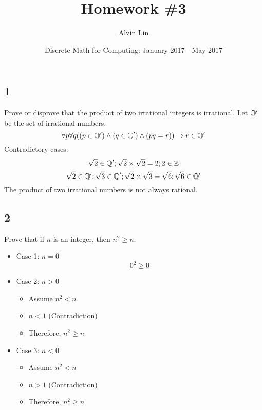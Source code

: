 \documentclass{math}
\title{Homework \#3}
\author{Alvin Lin}
\date{Discrete Math for Computing: January 2017 - May 2017}
\begin{document}
\maketitle

\subsection*{1}
Prove or disprove that the product of two irrational integers is irrational.
Let \( \mathbb{Q'} \) be the set of irrational numbers.
\[ \forall{p}\forall{q}((p\in\mathbb{Q'})\wedge(q\in\mathbb{Q'})\wedge(pq = r))\to r\in\mathbb{Q'} \]
Contradictory cases:
\[ \sqrt{2}\in\mathbb{Q'}; \sqrt{2}\times\sqrt{2} = 2; 2\in\mathbb{Z} \]
\[ \sqrt{2}\in\mathbb{Q'}; \sqrt{3}\in\mathbb{Q'}; \sqrt{2}\times\sqrt{3} = \sqrt{6};
   \sqrt{6}\in\mathbb{Q'} \]
The product of two irrational numbers is not always rational.

\subsection*{2}
Prove that if \( n \) is an integer, then \( n^{2} \geq n \).
\begin{itemize}
  \item Case 1: \( n = 0 \)
    \[ 0^{2} \geq 0 \]
  \item Case 2: \( n > 0 \)
    \begin{itemize}
      \item Assume \( n^{2} < n \)
      \item \( n < 1 \) (Contradiction)
      \item Therefore, \( n^{2} \geq n \)
    \end{itemize}
  \item Case 3: \( n < 0 \)
    \begin{itemize}
      \item Assume \( n^{2} < n \)
      \item \( n > 1 \) (Contradiction)
      \item Therefore, \( n^{2} \geq n \)
    \end{itemize}
\end{itemize}
\end{document}

